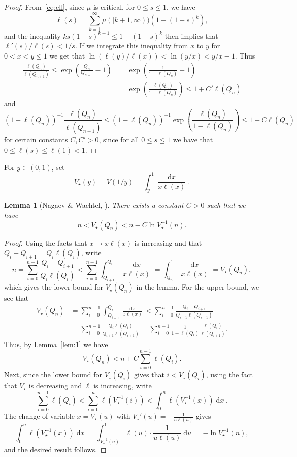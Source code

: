 \documentclass[10pt]{amsart}
\newtheorem{lemm}[theo]{Lemma}\newtheorem{prop}[theo]{Proposition}\newtheorem{coro}[theo]{Corollary}\newtheorem{conj}[theo]{Conjecture}
\theoremstyle{definition}\newtheorem{defi}[theo]{Definition}\newtheorem{rema}[theo]{Remark}\newtheorem{exam}[theo]{Example}\newtheorem{exem}[theo]{Example}\newtheorem{nota}[theo]{Notation}
\DeclareMathOperator{\dxseq}{d\mathit{x}}
\DeclareMathOperator{\duseq}{d\mathit{u}}
\begin{document}
\begin{proof}
From~\eqref{eq:ell}, since $\mu$ is critical, for $0 \leq s \leq 1$, we have
\[
\ell(s)=\sum_{k=1}^{\infty} \mu([k+1,\infty)) \left(1-(1-s)^{k}\right),
\]
and the inequality $k s (1-s)^{k-1} \leq 1-(1-s)^{k}$ then implies that $\ell'(s)/\ell(s) < 1/s$. If we integrate this inequality from $x$ to $y$ for $0<x<y \leq 1$ we get that $ \ln ({\ell(y)}/{\ell(x)}) < \ln({y}/{x}) < y/x-1$. Thus
\begin{align*}
\frac{\ell(Q_{n})}{\ell(Q_{n+1})} \leq \exp \left(\frac{Q_{n}}{Q_{n+1}}-1\right)&= \exp \left(\frac{1}{1-\ell(Q_{n})}-1 \right)\\
&= \exp \left(\frac{\ell(Q_{n})}{1-\ell(Q_{n})} \right) \leq 1+C' \ell(Q_{n})
\end{align*}
and
\[
(1-\ell(Q_{n}))^{-1} \frac{\ell(Q_{n})}{\ell(Q_{n+1})} \leq (1-\ell(Q_{n}))^{-1} \exp \left(\frac{\ell(Q_{n})}{1-\ell(Q_{n})} \right) \leq 1+C \ell(Q_{n})
\]
for certain constants $C,C'>0$, since for all $0\leq s\leq 1$ we have that $0\leq \ell(s) \leq \ell(1) <1$.
\end{proof}

For $ y \in (0,1)$, set
\[
V_{\star}(y)=V(1/y)=\int_{y}^{1} \frac{\dxseq}{x \ell(x)}.
\]


\begin{lemm}[{Nagaev \& Wachtel, \cite[Eq.~(51)]{NW07}}]\label{lem:2}
There exists a constant $C>0$ such that we have
\[
n < V_{\star}(Q_{n}) < n - C \ln V_{\star}^{-1}(n).
\]
\end{lemm}

\begin{proof}
Using the facts that $x \mapsto x \ell(x)$ is increasing and that $Q_{i}-Q_{i+1}=Q_i\ell(Q_i)$, write
\begin{equation*}\label{eq:lower_bound_W}
n= \sum_{i=0}^{n-1} \frac{Q_{i}-Q_{i+1}}{Q_{i} \ell(Q_{i})}< \sum_{i=0}^{n-1} \int_{Q_{i+1}}^{Q_{i}} \frac{\dxseq}{x \ell(x)}=\int_{Q_{n}}^{1} \frac{\dxseq}{x \ell(x)}=V_{\star}(Q_n),
\end{equation*}
which gives the lower bound for $V_{\star}(Q_n)$ in the lemma. For the upper bound, we see that
\begin{align*}
V_{\star}(Q_n) &=\sum_{i=0}^{n-1} \int_{Q_{i+1}}^{Q_{i}} \frac{\dxseq}{x \ell(x)} < \sum_{i=0}^{n-1} \frac{Q_{i}-Q_{i+1}}{Q_{i+1} \ell(Q_{i+1})}\\
&= \sum_{i=0}^{n-1} \frac{Q_{i}\ell(Q_i)}{Q_{i+1} \ell(Q_{i+1})}= \sum_{i=0}^{n-1} \frac{1}{1-\ell(Q_{i})} \frac{\ell(Q_i)}{\ell(Q_{i+1})}.
\end{align*}
Thus, by Lemma~\ref{lem:1} we have
\[
V_{\star}(Q_{n}) < n +C \sum_{i=0}^{n-1} \ell(Q_{i}).
\]
Next, since the lower bound for $V_{\star}(Q_i)$ gives that $i<V_{\star}(Q_{i})$, using the fact that $V_{\star}$ is decreasing and $\ell$ is increasing, write
\[
\sum_{i=0}^{n-1} \ell(Q_{i}) < \sum_{i=0}^{n} \ell \left(V_{\star}^{-1}(i)\right) < \int_{0} ^{n} \ell\left(V_{\star}^{-1}(x)\right) \dxseq.
\]
The change of variable $x=V_{\star}(u)$ with $V_{\star}'(u)= - \frac{1}{u \ell (u)}$ gives
\[
\int_{0} ^{n} \ell\left(V_{\star}^{-1}(x)\right) \dxseq= \int_{V_{\star}^{-1}(n)}^{1} \ell(u) \cdot \frac{1}{u \ell (u)} \duseq= - \ln V_{\star}^{-1}(n),
\]
and the desired result follows.
\end{proof}
\end{document}
